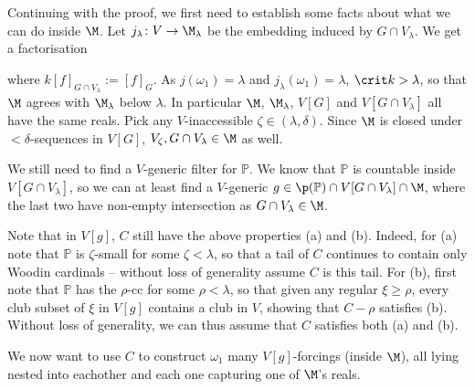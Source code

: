 {	\qquad Continuing with the proof, we first need to establish some facts about what we can do inside $\M$. Let $j_\lambda\colon V\to\M_\lambda$ be the embedding induced by $G\cap V_\lambda$. We get a factorisation

	where $k[f]_{G\cap V_\lambda}:=[f]_G$. As $j(\omega_1)=\lambda$ and $j_\lambda(\omega_1)=\lambda$, $\crit k>\lambda$, so that $\M$ agrees with $\M_\lambda$ below $\lambda$. In particular $\M$, $\M_\lambda$, $V[G]$ and $V[G\cap V_\lambda]$ all have the same reals. Pick any $V$-inaccessible $\zeta\in(\lambda,\delta)$. Since $\M$ is closed under $<\delta$-sequences in $V[G]$, $V_\zeta,G\cap V_\lambda\in\M$ as well.
	
	\qquad We still need to find a $V$-generic filter for $\mathbb P$. We know that $\mathbb P$ is countable inside $V[G\cap V_\lambda]$, so we can at least find a $V$-generic $g\in\p(\mathbb P)\cap V[G\cap V_\lambda]\cap\M$, where the last two have non-empty intersection as $G\cap V_\lambda\in\M$.

	\qquad Note that in $V[g]$, $C$ still have the above properties (a) and (b). Indeed, for (a) note that $\mathbb P$ is $\zeta$-small for some $\zeta<\lambda$, so that a tail of $C$ continues to contain only Woodin cardinals -- without loss of generality assume $C$ is this tail. For (b), first note that $\mathbb P$ has the $\rho$-cc for some $\rho<\lambda$, so that given any regular $\xi\geq\rho$, every club subset of $\xi$ in $V[g]$ contains a club in $V$, showing that $C-\rho$ satisfies (b). Without loss of generality, we can thus assume that $C$ satisfies both (a) and (b).
	
	\qquad We now want to use $C$ to construct $\omega_1$ many $V[g]$-forcings (inside $\M$), all lying nested into eachother and each one capturing one of $\M$'s reals.

	}
